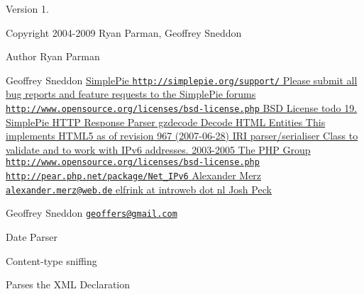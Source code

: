 \begin{DoxyVersion}{Version}
1. 
\end{DoxyVersion}
\begin{DoxyCopyright}{Copyright}
2004-\/2009 Ryan Parman, Geoffrey Sneddon 
\end{DoxyCopyright}
\begin{DoxyAuthor}{Author}
Ryan Parman 

Geoffrey Sneddon \hyperlink{}{Simple\-Pie  \href{http://simplepie.org/support/}{\tt http\-://simplepie.\-org/support/} Please submit all bug reports and feature requests to the Simple\-Pie forums  \href{http://www.opensource.org/licenses/bsd-license.php}{\tt http\-://www.\-opensource.\-org/licenses/bsd-\/license.\-php} B\-S\-D License  todo 19. Simple\-Pie H\-T\-T\-P Response Parser gzdecode Decode H\-T\-M\-L Entities This implements H\-T\-M\-L5 as of revision 967 (2007-\/06-\/28) I\-R\-I parser/serialiser Class to validate and to work with I\-Pv6 addresses.  2003-\/2005 The P\-H\-P Group  \href{http://www.opensource.org/licenses/bsd-license.php}{\tt http\-://www.\-opensource.\-org/licenses/bsd-\/license.\-php}  \href{http://pear.php.net/package/Net_IPv6}{\tt http\-://pear.\-php.\-net/package/\-Net\-\_\-\-I\-Pv6}  Alexander Merz \href{mailto:alexander.merz@web.de}{\tt alexander.\-merz@web.\-de}  elfrink at introweb dot nl  Josh Peck } 

Geoffrey Sneddon \href{mailto:geoffers@gmail.com}{\tt geoffers@gmail.\-com}
\end{DoxyAuthor}
Date Parser

Content-\/type sniffing

Parses the X\-M\-L Declaration 